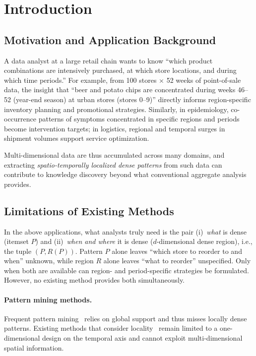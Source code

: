 \section{Introduction}\label{sec:intro}

\subsection{Motivation and Application Background}

A data analyst at a large retail chain wants to know
``which product combinations are intensively purchased,
at which store locations, and during which time periods.''
For example, from 100 stores $\times$ 52 weeks of
point-of-sale data, the insight that
``beer and potato chips are concentrated during
weeks 46--52 (year-end season) at urban stores (stores 0--9)''
directly informs region-specific inventory planning
and promotional strategies.
Similarly, in epidemiology, co-occurrence patterns of symptoms
concentrated in specific regions and periods
become intervention targets;
in logistics, regional and temporal surges in shipment volumes
support service optimization.

Multi-dimensional data are thus accumulated across many domains,
and extracting \emph{spatio-temporally localized dense patterns}
from such data can contribute to knowledge discovery
beyond what conventional aggregate analysis provides.

\subsection{Limitations of Existing Methods}

In the above applications, what analysts truly need is the pair
(i)~\emph{what} is dense (itemset $P$) and
(ii)~\emph{when and where} it is dense ($d$-dimensional dense region),
i.e., the tuple $(P, R(P))$.
Pattern $P$ alone leaves ``which store to reorder to and when'' unknown,
while region $R$ alone leaves ``what to reorder'' unspecified.
Only when both are available can region- and period-specific
strategies be formulated.
However, no existing method provides both simultaneously.

\paragraph{Pattern mining methods.}
Frequent pattern mining~\cite{agrawal1994apriori,han2000mining}
relies on global support and thus misses locally dense patterns.
Existing methods that consider locality~\cite{aprioriwindow}
remain limited to a one-dimensional design on the temporal axis
and cannot exploit multi-dimensional spatial information.
